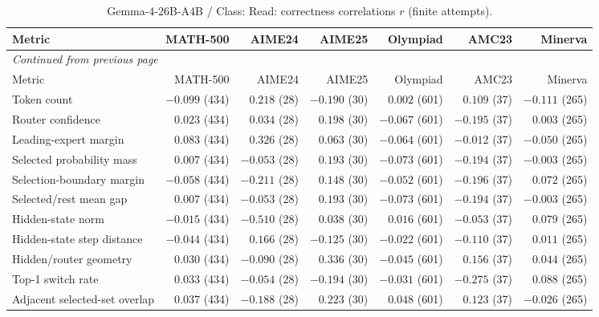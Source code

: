 \begingroup\scriptsize\setlength{\tabcolsep}{4pt}
\begin{longtable}{@{}lrrrrrr@{}}
\caption{Gemma-4-26B-A4B / Class: Read: correctness correlations $r$ (finite attempts).}\label{tab:multi-gemma-class-Read}\\
\toprule
Metric & MATH-500 & AIME24 & AIME25 & Olympiad & AMC23 & Minerva \\
\midrule\endfirsthead
\multicolumn{7}{l}{\textit{Continued from previous page}}\\
\toprule
Metric & MATH-500 & AIME24 & AIME25 & Olympiad & AMC23 & Minerva \\
\midrule\endhead
\bottomrule\endfoot
Token count & $-0.099$ (434) & $0.218$ (28) & $-0.190$ (30) & $0.002$ (601) & $0.109$ (37) & $-0.111$ (265) \\
Router confidence & $0.023$ (434) & $0.034$ (28) & $0.198$ (30) & $-0.067$ (601) & $-0.195$ (37) & $0.003$ (265) \\
Leading-expert margin & $0.083$ (434) & $0.326$ (28) & $0.063$ (30) & $-0.064$ (601) & $-0.012$ (37) & $-0.050$ (265) \\
Selected probability mass & $0.007$ (434) & $-0.053$ (28) & $0.193$ (30) & $-0.073$ (601) & $-0.194$ (37) & $-0.003$ (265) \\
Selection-boundary margin & $-0.058$ (434) & $-0.211$ (28) & $0.148$ (30) & $-0.052$ (601) & $-0.196$ (37) & $0.072$ (265) \\
Selected/rest mean gap & $0.007$ (434) & $-0.053$ (28) & $0.193$ (30) & $-0.073$ (601) & $-0.194$ (37) & $-0.003$ (265) \\
Hidden-state norm & $-0.015$ (434) & $-0.510$ (28) & $0.038$ (30) & $0.016$ (601) & $-0.053$ (37) & $0.079$ (265) \\
Hidden-state step distance & $-0.044$ (434) & $0.166$ (28) & $-0.125$ (30) & $-0.022$ (601) & $-0.110$ (37) & $0.011$ (265) \\
Hidden/router geometry & $0.030$ (434) & $-0.090$ (28) & $0.336$ (30) & $-0.045$ (601) & $0.156$ (37) & $0.044$ (265) \\
Top-1 switch rate & $0.033$ (434) & $-0.054$ (28) & $-0.194$ (30) & $-0.031$ (601) & $-0.275$ (37) & $0.088$ (265) \\
Adjacent selected-set overlap & $0.037$ (434) & $-0.188$ (28) & $0.223$ (30) & $0.048$ (601) & $0.123$ (37) & $-0.026$ (265) \\
\end{longtable}\endgroup

